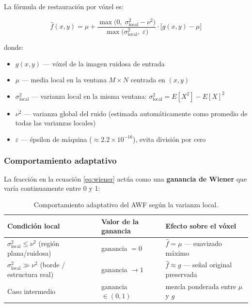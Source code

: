 \documentclass[12pt, a4paper]{article}
\begin{document}
La fórmula de restauración por vóxel es:

\begin{equation}
  \hat{f}(x,y) = \mu + \frac{\max\bigl(0,\;\sigma^2_{\text{local}} - \nu^2\bigr)}
                             {\max\bigl(\sigma^2_{\text{local}},\;\varepsilon\bigr)}
                 \cdot \bigl[g(x,y) - \mu\bigr]
  \label{eq:wiener}
\end{equation}

donde:
\begin{itemize}
  \item $g(x,y)$ — vóxel de la imagen ruidosa de entrada
  \item $\mu$ — media local en la ventana $M \times N$ centrada en $(x,y)$
  \item $\sigma^2_{\text{local}}$ — varianza local en la misma ventana: $\sigma^2_{\text{local}} = E[X^2] - E[X]^2$
  \item $\nu^2$ — varianza global del ruido (estimada automáticamente como promedio de todas las varianzas locales)
  \item $\varepsilon$ — épsilon de máquina ($\approx 2.2 \times 10^{-16}$), evita división por cero
\end{itemize}

\subsubsection{Comportamiento adaptativo}

La fracción en la ecuación \eqref{eq:wiener} actúa como una \textbf{ganancia de Wiener}
que varía continua\-mente entre 0 y 1:

\begin{table}[H]
\centering
\renewcommand{\arraystretch}{1.4}
\begin{tabularx}{\textwidth}{lXX}
\toprule
\textbf{Condición local} & \textbf{Valor de la ganancia} & \textbf{Efecto sobre el vóxel} \\
\midrule
$\sigma^2_{\text{local}} \leq \nu^2$ (región plana/ruidosa) &
ganancia $= 0$ &
$\hat{f} = \mu$ — suavizado máximo \\
$\sigma^2_{\text{local}} \gg \nu^2$ (borde / estructura real) &
ganancia $\to 1$ &
$\hat{f} \approx g$ — señal original preservada \\
Caso intermedio &
ganancia $\in (0,1)$ &
mezcla ponderada entre $\mu$ y $g$ \\
\bottomrule
\end{tabularx}
\caption{Comportamiento adaptativo del AWF según la varianza local.}
\end{table}
\end{document}

